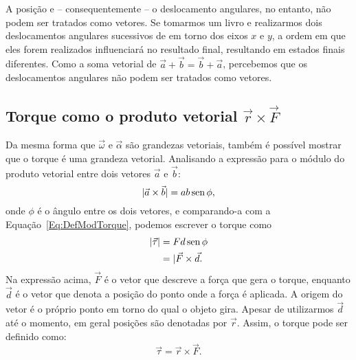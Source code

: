 A posição e -- consequentemente -- o deslocamento angulares, no entanto, não podem ser tratados como vetores. Se tomarmos um livro e realizarmos dois deslocamentos angulares sucessivos de  em torno dos eixos $x$ e $y$, a ordem em que eles forem realizados influenciará no resultado final, resultando em estados finais diferentes. Como a soma vetorial de $\vec{a} + \vec{b} = \vec{b} + \vec{a}$, percebemos que os deslocamentos angulares não podem ser tratados como vetores.


\subsection{Torque como o produto vetorial $\vec{r}\times\vec{F}$}

Da mesma forma que $\vec{\omega}$ e $\vec{\alpha}$ são grandezas vetoriais, também é possível mostrar que o torque é uma grandeza vetorial. Analisando a expressão para o módulo do produto vetorial entre dois vetores $\vec{a}$ e $\vec{b}$:
\begin{equation}
  |\vec{a}\times\vec{b}| = ab\operatorname{sen}\phi,
\end{equation}
%
onde $\phi$ é o ângulo entre os dois vetores, e comparando-a com a Equação~\eqref{Eq:DefModTorque}, podemos escrever o torque como
\begin{align}
  |\vec{\tau}| &= F d \operatorname{sen}\phi \\
  &= |\vec{F}\times\vec{d}.
\end{align}
%
Na expressão acima, $\vec{F}$ é o vetor que descreve a força que gera o torque, enquanto $\vec{d}$ é o vetor que denota a posição do ponto onde a força é aplicada. A origem do vetor é o próprio ponto em torno do qual o objeto gira. Apesar de utilizarmos $\vec{d}$ até o momento, em geral posições são denotadas por $\vec{r}$. Assim, o torque pode ser definido como: 
\begin{equation}\label{Eq:DefTorque}
  \vec{\tau} = \vec{r}\times\vec{F}.
\end{equation}

